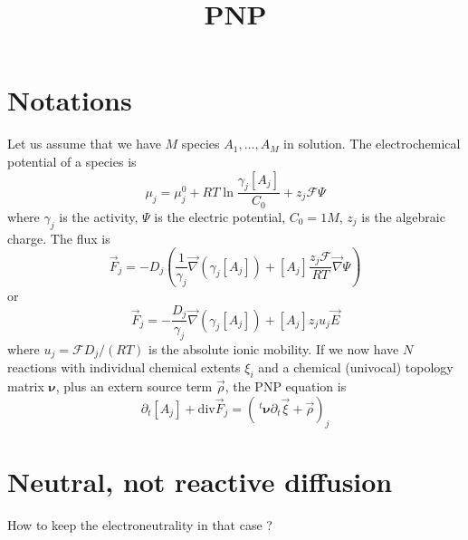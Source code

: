 \documentclass{revtex4}
\newcommand{\trn}{\!\!~^t}
\begin{document}
	\title{PNP}
	\maketitle
	
\section{Notations}
Let us assume that we have $M$ species $A_1,\ldots,A_M$ in solution.
The electrochemical potential of a species is
\begin{equation}
	\mu_j = \mu^{0}_j + RT \ln \dfrac{\gamma_j[A_j]}{C_0} + z_j\mathcal{F}\Psi
\end{equation}
where $\gamma_j$ is the activity, $\Psi$ is the electric potential, $C_0=1M$, $z_j$ is the algebraic charge.
The flux is
\begin{equation}
	\vec{F}_j = -D_j 
	\left( 
		\dfrac{1}{\gamma_j} \vec{\nabla} \left( \gamma_j [A_j] \right) + 
		[A_j] \dfrac{z_j\mathcal{F}}{RT} \vec{\nabla}\Psi
	\right)
\end{equation}
or
\begin{equation}
	\vec{F}_j = - \dfrac{D_j}{\gamma_j} \vec{\nabla} \left( \gamma_j [A_j] \right) + [A_j] z_j u_j \vec{E}
\end{equation}
where $u_j = \mathcal{F}D_j/(RT)$ is the absolute ionic mobility.
If we now have $N$ reactions with individual chemical extents $\xi_i$ and
a chemical (univocal) topology matrix $\pmb{\nu}$, plus an extern source term $\vec{\rho}$, the PNP equation is
\begin{equation}
	\partial_t [A_j] + \mathrm{div}\vec{F}_j = \left(\trn\pmb{\nu} \partial_t \vec{\xi} + \vec{\rho}\right)_j
\end{equation}


\section{Neutral, not reactive diffusion}
How to keep the electroneutrality in that case ?
\end{document}
